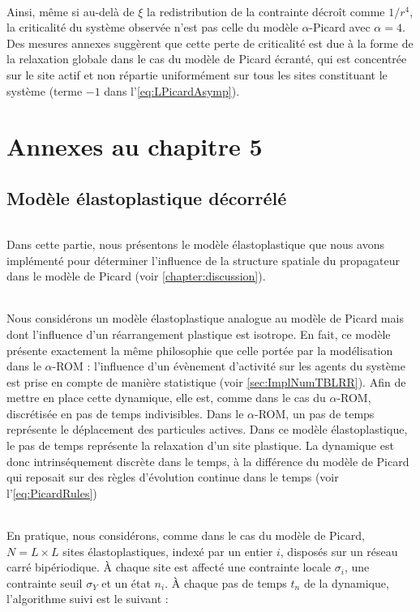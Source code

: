 \subparagraph{}Ainsi, même si au-delà de $\xi$ la redistribution de la contrainte décroît comme $1/r^4$, la criticalité du système observée n'est pas celle du modèle $\alpha$-Picard avec $\alpha = 4$. Des mesures annexes suggèrent que cette perte de criticalité est due à la forme de la relaxation globale dans le cas du modèle de Picard écranté, qui est concentrée sur le site actif et non répartie uniformément sur tous les sites constituant le système (terme $-1$ dans l'\autoref{eq:LPicardAsymp}).

\resumetocwriting

\chapter{Annexes au chapitre 5}

\section{Modèle élastoplastique décorrélé}

\label{sec:EPMdiscret}

\subparagraph{}Dans cette partie, nous présentons le modèle élastoplastique que nous avons implémenté pour déterminer l'influence de la structure spatiale du propagateur dans le modèle de Picard (voir \autoref{chapter:discussion}).

\subparagraph{}Nous considérons un modèle élastoplastique analogue au modèle de Picard mais dont l'influence d'un réarrangement plastique est isotrope. En fait, ce modèle présente exactement la même philosophie que celle portée par la modélisation dans le $\alpha$-ROM : l'influence d'un évènement d'activité sur les agents du système est prise en compte de manière statistique (voir \autoref{sec:ImplNumTBLRR}). Afin de mettre en place cette dynamique, elle est, comme dans le cas du $\alpha$-ROM, discrétisée en pas de temps indivisibles. Dans le $\alpha$-ROM, un pas de temps représente le déplacement des particules actives. Dans ce modèle élastoplastique, le pas de temps représente la relaxation d'un site plastique. La dynamique est donc intrinséquement discrète dans le temps, à la différence du modèle de Picard qui reposait sur des règles d'évolution continue dans le temps (voir l'\autoref{eq:PicardRules})

\subparagraph{}En pratique, nous considérons, comme dans le cas du modèle de Picard, $N = L\times L$ sites élastoplastiques, indexé par un entier $i$, disposés sur un réseau carré bipériodique. \`A chaque site est affecté une contrainte locale $\sigma_i$, une contrainte seuil $\sigma_Y$ et un état $n_i$. \`A chaque pas de temps $t_n$ de la dynamique, l'algorithme suivi est le suivant :

